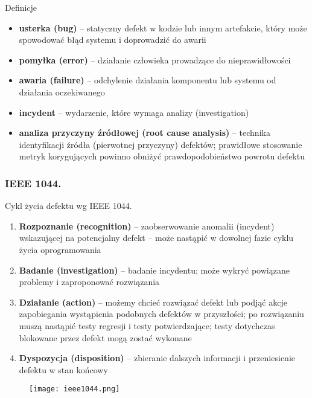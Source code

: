 \documentclass[../main.tex]{subfiles}
\begin{document}
    Definicje
    \begin{itemize}
        \item \textbf{usterka (bug)} – statyczny defekt w kodzie lub innym artefakcie, który może spowodować błąd systemu i doprowadzić do awarii
        \item \textbf{pomyłka (error)} – działanie człowieka prowadzące do nieprawidłowości
        \item \textbf{awaria (failure)} – odchylenie działania komponentu lub systemu od działania oczekiwanego
        \item \textbf{incydent} – wydarzenie, które wymaga analizy (investigation)
        \item \textbf{analiza przyczyny źródłowej (root cause analysis)} – technika identyfikacji źródła (pierwotnej przyczyny) defektów; prawidłowe stosowanie metryk korygujących powinno obniżyć prawdopodobieństwo powrotu defektu
    \end{itemize}

    \subsubsection{IEEE 1044.}
    Cykl życia defektu wg IEEE 1044.
    \begin{enumerate}
        \item \textbf{Rozpoznanie (recognition)} – zaobserwowanie anomalii (incydent) wskazującej na potencjalny defekt – może nastąpić w dowolnej fazie cyklu życia oprogramowania
        \item \textbf{Badanie (investigation)} – badanie incydentu; może wykryć powiązane problemy i zaproponować rozwiązania
        \item \textbf{Działanie (action)} – możemy chcieć rozwiązać defekt lub podjąć akcje zapobiegania wystąpienia podobnych defektów w przyszłości; po rozwiązaniu muszą nastąpić testy regresji i testy potwierdzające; testy dotychczas blokowane przez defekt mogą zostać wykonane
        \item \textbf{Dyspozycja (disposition)} – zbieranie dalszych informacji i przeniesienie defektu w stan końcowy
    \end{enumerate}

    \begin{figure}[H]
        \texttt{[image: ieee1044.png]}
    \end{figure}
\end{document}
